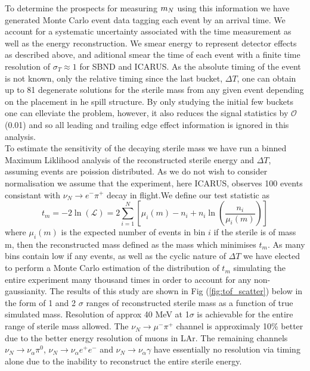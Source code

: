\documentclass[11pt, a4paper]{article}
\def\ster{\ensuremath N}
\begin{document}
To determine the prospects for measuring $m_{\ster}$ using this information we
have generated Monte Carlo event data tagging each event by an arrival time.
We account for a systematic uncertainty associated with the time measurement as
well as the energy reconstruction. We smear energy to represent detector
effects as described above, and aditional smear the time of each event with a
finite time resolution of $\sigma_T  \approx 1$ for SBND and ICARUS. As the
absolute timing of the event is not known, only the relative timing since the
last bucket, $\Delta T$, one can obtain up to 81 degenerate solutions for the
sterile mass from any given event depending on the placement in he spill
structure. By only studying the initial few buckets one can elleviate the
problem, however, it also reduces the signal statistics by $\mathcal{O}$(0.01)
and so all leading and trailing edge effect information is ignored in this analysis. \\

To estimate the sensitivity of the decaying sterile mass we have run a binned Maximum Liklihood analysis of the reconstructed sterile energy and $\Delta T$, assuming events are poission distributed. As we do not wish to consider normalisation we assume that the experiment, here ICARUS, observes 100 events consistant with $\nu_N\rightarrow e^- \pi^+$ decay in flight.We define our test statistic as \[
	t_m = -2 \ln \left(\mathcal{L}\right) =  2 \sum_{i=1}^N \left[ \mu_i(m)-n_i +n_i \ln(\frac{n_i}{\mu_i(m)})  \right]
\]
where $\mu_i(m)$ is the expected number of events in bin $i$ if the sterile is of mass m, then the reconstructed mass defined as the mass which minimises $t_m$. As many bins contain low if any events, as well as the cyclic nature of $\Delta T$ we have elected to perform a Monte Carlo estimation of the distribution of $t_m$ simulating the entire experiment many thousand times in order to account for any non-gaussianity. The results of this study are shown in Fig (\ref{fig:tof_scatter}) below in the form of 1 and 2 $\sigma$ ranges of reconstructed sterile mass as a function of true simulated mass. Resolution of approx 40 MeV at 1$\sigma$ is achievable for the entire range of sterile mass allowed. The  $\nu_N\rightarrow \mu^- \pi^+$ channel is approximaly 10\% better due to the better energy resolution of muons in LAr. The remaining channels $\nu_N\rightarrow \nu_\alpha \pi^0$, $\nu_N\rightarrow \nu_\alpha e^+ e^-$ and $\nu_N\rightarrow \nu_\alpha \gamma$ have essentially no resolution via timing alone due to the inability to reconstruct the entire sterile energy.
\end{document}
